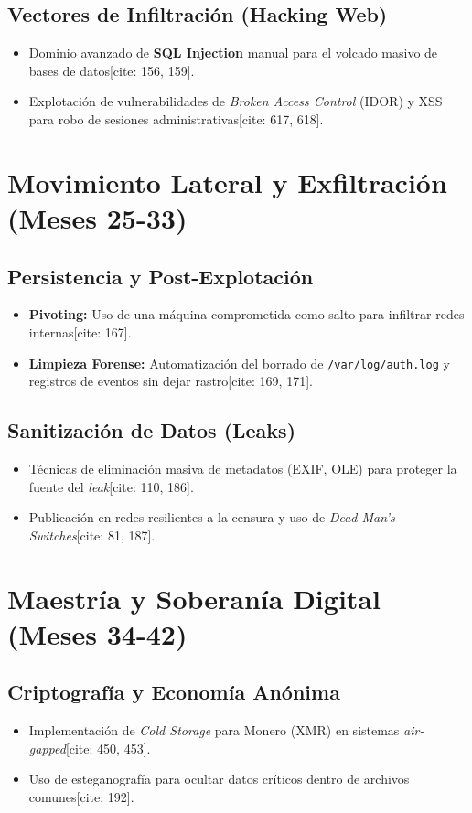 \documentclass[11pt,a4paper]{report}
\begin{document}
	\section{Vectores de Infiltración (Hacking Web)}
	\begin{itemize}
		\item Dominio avanzado de \textbf{SQL Injection} manual para el volcado masivo de bases de datos[cite: 156, 159].
		\item Explotación de vulnerabilidades de \textit{Broken Access Control} (IDOR) y XSS para robo de sesiones administrativas[cite: 617, 618].
	\end{itemize}
	
	\chapter{Movimiento Lateral y Exfiltración (Meses 25-33)}
	
	\section{Persistencia y Post-Explotación}
	\begin{itemize}
		\item \textbf{Pivoting:} Uso de una máquina comprometida como salto para infiltrar redes internas[cite: 167].
		\item \textbf{Limpieza Forense:} Automatización del borrado de \texttt{/var/log/auth.log} y registros de eventos sin dejar rastro[cite: 169, 171].
	\end{itemize}
	
	\section{Sanitización de Datos (Leaks)}
	\begin{itemize}
		\item Técnicas de eliminación masiva de metadatos (EXIF, OLE) para proteger la fuente del \textit{leak}[cite: 110, 186].
		\item Publicación en redes resilientes a la censura y uso de \textit{Dead Man's Switches}[cite: 81, 187].
	\end{itemize}
	
	\chapter{Maestría y Soberanía Digital (Meses 34-42)}
	
	\section{Criptografía y Economía Anónima}
	\begin{itemize}
		\item Implementación de \textit{Cold Storage} para Monero (XMR) en sistemas \textit{air-gapped}[cite: 450, 453].
		\item Uso de esteganografía para ocultar datos críticos dentro de archivos comunes[cite: 192].
	\end{itemize}
	
\end{document}
